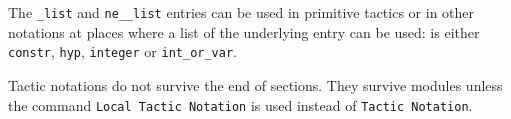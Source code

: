 \Rem The {\tt {}\_list} and {\tt ne\_{}\_list}
entries can be used in primitive tactics or in other notations at
places where a list of the underlying entry can be used: {} is
either {\tt\small constr}, {\tt\small hyp}, {\tt\small integer} or
{\tt\small int\_or\_var}.

Tactic notations do not survive the end of sections. They survive
modules unless the command {\tt Local Tactic Notation} is used instead
of {\tt Tactic Notation}.

